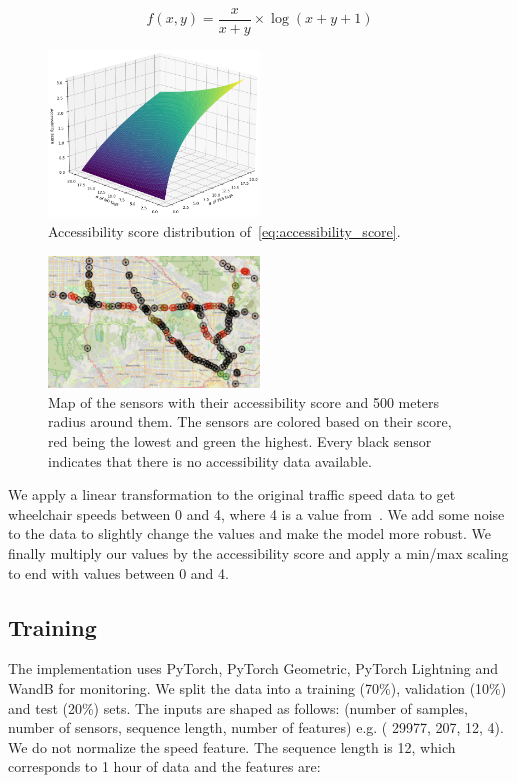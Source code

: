 \begin{equation}
    f(x, y) = \frac{x}{x + y} \times \log(x + y + 1)\label{eq:accessibility_score}
\end{equation}
\vspace{1em}

\begin{figure}[htbp]
    \centering
    \includegraphics[width=0.5\textwidth]{images/accessibility_score_function}
    \caption{Accessibility score distribution of~\eqref{eq:accessibility_score}.}
    \label{fig:accessibility_score_function}
\end{figure}

\begin{figure}[htbp]
    \centering
    \includegraphics[width=0.5\textwidth]{images/map}
    \caption{
        Map of the sensors with their accessibility score and 500 meters radius around them.
        The sensors are colored based on their score, red being the lowest and green the highest.
        Every black sensor indicates that there is no accessibility data available.
    }
    \label{fig:map}
\end{figure}

We apply a linear transformation to the original traffic speed data to get wheelchair speeds between 0 and 4, where 4 is
a value from~\cite{FreedomMobility}.
We add some noise to the data to slightly change the values and make the model more robust.
We finally multiply our values by the accessibility score and apply a min/max scaling to end with values between 0 and
4.

\subsection{Training}\label{subsec:training}
The implementation uses PyTorch, PyTorch Geometric, PyTorch Lightning and WandB for monitoring.
We split the data into a training (70\%), validation (10\%) and test (20\%) sets.
The inputs are shaped as follows: (number of samples, number of sensors, sequence length, number of features) e.g. (
29977, 207, 12, 4).
We do not normalize the speed feature.
The sequence length is 12, which corresponds to 1 hour of data and the features are:

